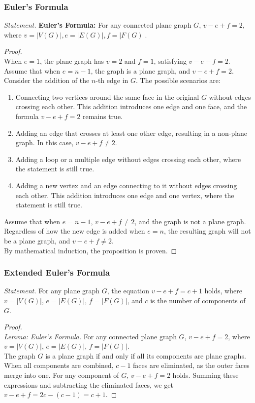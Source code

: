 \documentclass[a4paper,12pt]{report}
\begin{document}
\subsubsection{Euler's Formula}
\textit{Statement. }\textbf{Euler's Formula:} For any connected plane graph \(G\), \(v - e + f = 2\), where \(v=|V(G)|, e=|E(G)|, f=|F(G)|\).
\begin{proof}\mbox{}\\
When \(e = 1\), the plane graph has \(v = 2\) and \(f = 1\), satisfying \(v - e + f = 2\). \\
Assume that when \(e = n - 1\), the graph is a plane graph, and \(v - e + f = 2\). Consider the addition of the \(n\)-th edge in \(G\). The possible scenarios are:
\begin{enumerate}[label=(\arabic*)]
\item Connecting two vertices around the same face in the original \(G\) without edges crossing each other. This addition introduces one edge and one face, and the formula \(v - e + f = 2\) remains true.
\item Adding an edge that crosses at least one other edge, resulting in a non-plane graph. In this case, \(v - e + f \neq 2\).
\item Adding a loop or a multiple edge without edges crossing each other, where the statement is still true.
\item Adding a new vertex and an edge connecting to it without edges crossing each other. This addition introduces one edge and one vertex, where the statement is still true.
\end{enumerate}
Assume that when \(e = n - 1\), \(v - e + f \neq 2\), and the graph is not a plane graph. Regardless of how the new edge is added when \(e = n\), the resulting graph will not be a plane graph, and \(v - e + f \neq 2\). \\
By mathematical induction, the proposition is proven.
\end{proof}
\subsubsection{Extended Euler's Formula}
\textit{Statement. }For any plane graph \(G\), the equation \(v - e + f = c + 1\) holds, where \(v=|V(G)|\), \(e=|E(G)|\), \(f=|F(G)|\), and \(c\) is the number of components of \(G\).
\begin{proof}\mbox{}\\
\textit{Lemma: Euler's Formula. }For any connected plane graph \(G\), \(v - e + f = 2\), where \(v=|V(G)|\), \(e=|E(G)|\), \(f=|F(G)|\). \\
The graph \(G\) is a plane graph if and only if all its components are plane graphs. When all components are combined, \(c-1\) faces are eliminated, as the outer faces merge into one. For any component of \(G\), \(v - e + f = 2\) holds. Summing these expressions and subtracting the eliminated faces, we get \(v-e+f = 2c - (c-1) = c+1\).
\end{proof}
\end{document}
